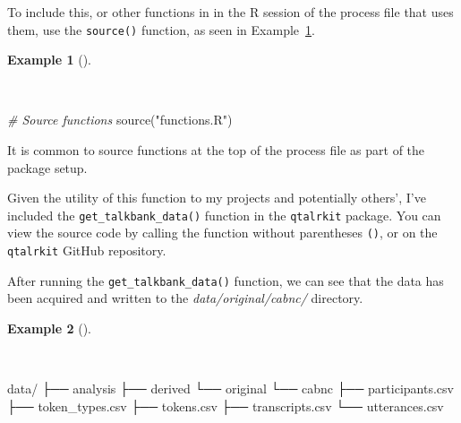 \documentclass[
  letterpaper,
]{latex/krantz}
\newenvironment{Shaded}{\begin{snugshade}}{\end{snugshade}}
\newcommand{\CommentTok}[1]{\textcolor[rgb]{0.00,0.00,0.00}{\textit{#1}}}
\newcommand{\ExtensionTok}[1]{\textcolor[rgb]{0.00,0.00,0.00}{#1}}
\newcommand{\FunctionTok}[1]{\textcolor[rgb]{0.00,0.00,0.00}{#1}}
\newcommand{\NormalTok}[1]{\textcolor[rgb]{0.00,0.00,0.00}{#1}}
\newcommand{\StringTok}[1]{\textcolor[rgb]{0.00,0.00,0.00}{#1}}
\theoremstyle{definition}
\newtheorem{example}{Example}[chapter]
\theoremstyle{remark}
\begin{document}
To include this, or other functions in in the R session of the process
file that uses them, use the \texttt{source()} function, as seen in
Example~\ref{exm-ad-source-functions}.

\begin{example}[]\protect\hypertarget{exm-ad-source-functions}{}\label{exm-ad-source-functions}

~

\begin{Shaded}
\begin{Highlighting}[]
\CommentTok{\# Source functions}
\FunctionTok{source}\NormalTok{(}\StringTok{"functions.R"}\NormalTok{)}
\end{Highlighting}
\end{Shaded}

\end{example}

It is common to source functions at the top of the process file as part
of the package setup.

Given the utility of this function to my projects and potentially
others', I've included the \texttt{get\_talkbank\_data()} function in
the \texttt{qtalrkit} package. You can view the source code by calling
the function without parentheses \texttt{()}, or on the
\texttt{qtalrkit} GitHub repository.

After running the \texttt{get\_talkbank\_data()} function, we can see
that the data has been acquired and written to the
\emph{data/original/cabnc/} directory.

\begin{example}[]\protect\hypertarget{exm-ad-functions-r}{}\label{exm-ad-functions-r}

~

\begin{Shaded}
\begin{Highlighting}[]
\ExtensionTok{data/}
\ExtensionTok{├──}\NormalTok{ analysis}
\ExtensionTok{├──}\NormalTok{ derived}
\ExtensionTok{└──}\NormalTok{ original}
    \ExtensionTok{└──}\NormalTok{ cabnc}
        \ExtensionTok{├──}\NormalTok{ participants.csv}
        \ExtensionTok{├──}\NormalTok{ token\_types.csv}
        \ExtensionTok{├──}\NormalTok{ tokens.csv}
        \ExtensionTok{├──}\NormalTok{ transcripts.csv}
        \ExtensionTok{└──}\NormalTok{ utterances.csv}
\end{Highlighting}
\end{Shaded}

\end{example}
\end{document}
